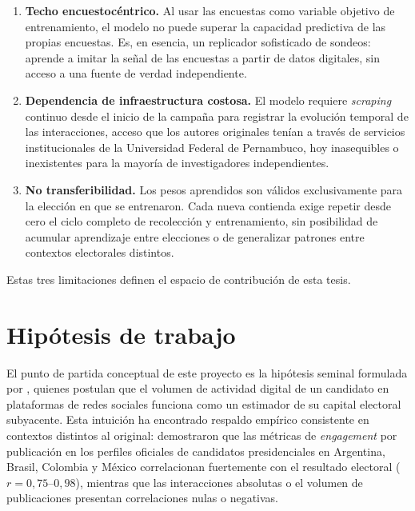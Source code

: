 \begin{enumerate}
  \item \textbf{Techo encuestocéntrico.} Al usar las encuestas como variable
        objetivo de entrenamiento, el modelo no puede superar la capacidad
        predictiva de las propias encuestas. Es, en esencia, un replicador
        sofisticado de sondeos: aprende a imitar la señal de las encuestas
        a partir de datos digitales, sin acceso a una fuente de verdad
        independiente.

  \item \textbf{Dependencia de infraestructura costosa.} El modelo requiere
        \textit{scraping} continuo desde el inicio de la campaña para registrar
        la evolución temporal de las interacciones, acceso que los autores
        originales tenían a través de servicios institucionales de la
        Universidad Federal de Pernambuco, hoy inasequibles o inexistentes
        para la mayoría de investigadores independientes.

  \item \textbf{No transferibilidad.} Los pesos aprendidos son válidos
        exclusivamente para la elección en que se entrenaron. Cada nueva
        contienda exige repetir desde cero el ciclo completo de recolección y
        entrenamiento, sin posibilidad de acumular aprendizaje entre elecciones
        o de generalizar patrones entre contextos electorales distintos.
\end{enumerate}

Estas tres limitaciones definen el espacio de contribución de esta tesis.

\section{Hipótesis de trabajo}

El punto de partida conceptual de este proyecto es la hipótesis seminal
formulada por \textcite{tumasjan2010}, quienes postulan que el volumen
de actividad digital de un candidato en plataformas de redes sociales
funciona como un estimador de su capital electoral subyacente. Esta
intuición ha encontrado respaldo empírico consistente en contextos
distintos al original: \textcite{brito2022measuring} demostraron que
las métricas de \textit{engagement} por publicación en los perfiles
oficiales de candidatos presidenciales en Argentina, Brasil, Colombia
y México correlacionan fuertemente con el resultado electoral
($r = 0{,}75$--$0{,}98$), mientras que las interacciones absolutas o
el volumen de publicaciones presentan correlaciones nulas o negativas.


